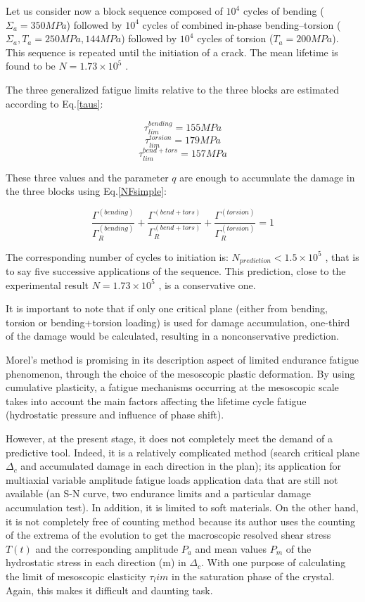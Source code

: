 \documentclass[3p,times,procedia,number]{elsarticle}
\begin{document}
Let us consider now a block sequence composed of
$10^4$ cycles of bending ($\Sigma_a =350 MPa$) followed by $10^4$
cycles of combined in-phase bending–torsion ($\Sigma_a ,T_a =250 MPa, 144 MPa$)
followed by $10^4$ cycles of torsion ($T_a =200 MPa$). This
sequence is repeated until the initiation of a crack. The
mean lifetime is found to be $N=1.73×10^5$ .

The three generalized fatigue
limits relative to the three blocks are estimated according
to Eq.\eqref{taus}:

$$\tau_{lim}^{bending}=155 MPa$$   $$\tau_{lim}^{torsion}=179 MPa$$  $$\tau_{lim}^{bend+tors}=157 MPa$$


These three values and the parameter $q$ are enough to
accumulate the damage in the three blocks using Eq.\eqref{NFsimple}:


$$\frac{\Gamma^{(bending)}}{\Gamma_R^{(bending)}}+\frac{\Gamma^{(bend+tors)}}{\Gamma_R^{(bend+tors)}}+\frac{\Gamma^{(torsion)}}{\Gamma_R^{(torsion)}}=1$$

The corresponding number of cycles to initiation is:
$N_{prediction} <1.5×10^5$ , that is to say five successive applications of the sequence. This prediction, close to the experimental result $N=1.73×10^5$ , is a conservative one.

It is important to note that if only one critical plane
(either from bending, torsion or bending+torsion
loading) is used for damage accumulation, one-third of
the damage would be calculated, resulting in a nonconservative prediction.

Morel's method is promising in its description aspect of limited endurance fatigue phenomenon, through the choice of the  mesoscopic plastic deformation. By using cumulative plasticity, a fatigue mechanisms occurring at the mesoscopic scale takes into account the main factors affecting the lifetime cycle fatigue (hydrostatic pressure and influence of phase shift). 

However, at the present stage, it does not completely meet the demand of a predictive tool. Indeed, it is a relatively complicated method (search critical plane $\Delta_c$ and accumulated damage in each direction in the plan); its application for multiaxial variable amplitude fatigue loads application data that are still not available (an S-N curve, two endurance limits and a particular  damage accumulation test). In addition, it is limited to soft materials. On the other hand, it is not completely free of counting method because its author uses the counting of the extrema of the evolution to get the macroscopic resolved shear stress $T(t)$ and the corresponding amplitude $P_a$ and mean values $P_m$ of the hydrostatic stress in each direction (m) in $\Delta_c$. With one purpose of calculating the limit of mesoscopic elasticity $\tau_lim$ in the saturation phase of the crystal. Again, this makes it difficult and daunting task.
\end{document}

